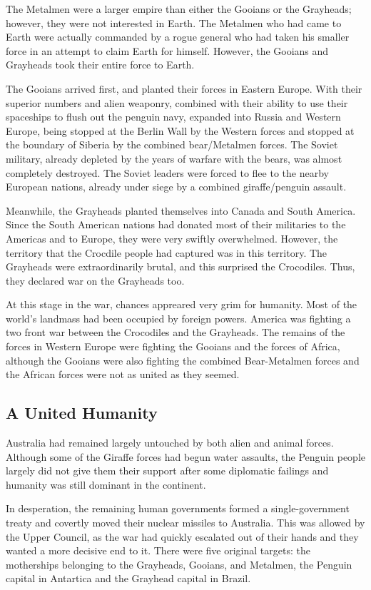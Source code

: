 \documentclass{article}
\begin{document}
The Metalmen were a larger empire than either the Gooians or the Grayheads; however, they were not interested in Earth. The Metalmen who had came to Earth were actually commanded by a rogue general who had taken his smaller force in an attempt to claim Earth for himself. However, the Gooians and Grayheads took their entire force to Earth.

The Gooians arrived first, and planted their forces in Eastern Europe. With their superior numbers and alien weaponry, combined with their ability to use their spaceships to flush out the penguin navy, expanded into Russia and Western Europe, being stopped at the Berlin Wall by the Western forces and stopped at the boundary of Siberia by the combined bear/Metalmen forces. The Soviet military, already depleted by the years of warfare with the bears, was almost completely destroyed. The Soviet leaders were forced to flee to the nearby European nations, already under siege by a combined giraffe/penguin assault.

Meanwhile, the Grayheads planted themselves into Canada and South America. Since the South American nations had donated most of their militaries to the Americas and to Europe, they were very swiftly overwhelmed. However, the territory that the Crocdile people had captured was in this territory. The Grayheads were extraordinarily brutal, and this surprised the Crocodiles. Thus, they declared war on the Grayheads too.

At this stage in the war, chances appreared very grim for humanity. Most of the world's landmass had been occupied by foreign powers. America was fighting a two front war between the Crocodiles and the Grayheads. The remains of the forces in Western Europe were fighting the Gooians and the forces of Africa, although the Gooians were also fighting the combined Bear-Metalmen forces and the African forces were not as united as they seemed.

\subsection{A United Humanity}

Australia had remained largely untouched by both alien and animal forces. Although some of the Giraffe forces had begun water assaults, the Penguin people largely did not give them their support after some diplomatic failings and humanity was still dominant in the continent.

In desperation, the remaining human governments formed a single-government treaty and covertly moved their nuclear missiles to Australia. This was allowed by the Upper Council, as the war had quickly escalated out of their hands and they wanted a more decisive end to it. There were five original targets: the motherships belonging to the Grayheads, Gooians, and Metalmen, the Penguin capital in Antartica and the Grayhead capital in Brazil.
\end{document}
